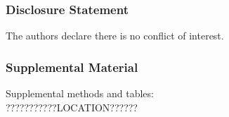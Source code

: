 \subsubsection{Disclosure Statement} 
The authors declare there is no conflict of interest.

\subsubsection{Supplemental Material}
Supplemental methods and tables: \\ ???????????LOCATION?????? \\

